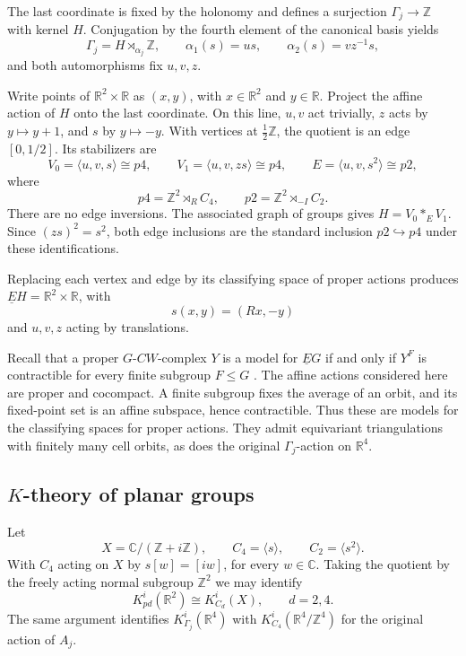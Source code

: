 \documentclass[11pt]{amsart}
\newcommand{\Z}{\mathbb Z}
\newcommand{\R}{\mathbb R}
\newcommand{\C}{\mathbb C}
\theoremstyle{remark}
\numberwithin{equation}{section}
\begin{document}
The last coordinate is fixed by the holonomy and defines a surjection $\Gamma_j\to\Z$ with kernel $H$. Conjugation by the fourth element of the canonical basis yields
\begin{equation}\label{eq:alphas}
 \Gamma_j=H\rtimes_{\alpha_j}\Z,\qquad
 \alpha_1(s)=us,\qquad \alpha_2(s)=vz^{-1}s,
\end{equation}
and both automorphisms fix $u,v,z$.

Write points of $\R^2\times\R$ as $(x,y)$, with $x\in\R^2$ and $y\in\R$. Project the affine action of $H$ onto the last coordinate. On this line, $u,v$ act trivially, $z$ acts by $y\mapsto y+1$, and $s$ by $y\mapsto-y$. With vertices at $\frac12\Z$, the quotient is an edge $[0,1/2]$. Its stabilizers are
\[
 V_0=\langle u,v,s\rangle\cong p4,\qquad
 V_1=\langle u,v,zs\rangle\cong p4,\qquad
 E=\langle u,v,s^2\rangle\cong p2,
\]
where
\[
 p4=\Z^2\rtimes_R C_4,\qquad
 p2=\Z^2\rtimes_{-I}C_2.
\]
There are no edge inversions. The associated graph of groups gives $H=V_0*_E V_1$. Since $(zs)^2=s^2$, both edge inclusions are the standard inclusion $p2\hookrightarrow p4$ under these identifications.

Replacing each vertex and edge by its classifying space of proper actions produces
$\underline EH=\R^2\times\R$, with
\[
 s(x,y)=(Rx,-y)
\]
and $u,v,z$ acting by translations. 

Recall that a proper $G$-$CW$-complex $Y$ is a model for $\underline EG$ if and only if $Y^F$ is contractible for every finite subgroup $F\leq G$ \cite[Theorem~1.9]{LuckSurvey}.
The affine actions considered here are proper and cocompact. A finite subgroup fixes the average of an orbit, and its fixed-point set is an affine subspace, hence contractible. Thus these are models for the classifying spaces for proper actions. They admit equivariant triangulations with finitely many cell orbits, as does the original $\Gamma_j$-action on $\R^4$.

\subsection{\texorpdfstring{$K$}{K}-theory of planar groups}
\label{sec:planar}

Let
\[
 X=\C/(\Z+i\Z),\qquad C_4=\langle s\rangle,
 \qquad C_2=\langle s^2\rangle.
\]
With $C_4$ acting on $X$ by $ s[w]=[iw]$, for every $w\in\C$. 
Taking the quotient by the freely acting normal subgroup $\Z^2$ we may identify
\begin{equation}\label{eq:descent}
 K_{p d}^i(\R^2)\cong K_{C_d}^i(X),\qquad d=2,4.
\end{equation}
 The same argument identifies $K_{\Gamma_j}^i(\R^4)$ with $K_{C_4}^i(\R^4/\Z^4)$ for the original action of $A_j$.
\end{document}
